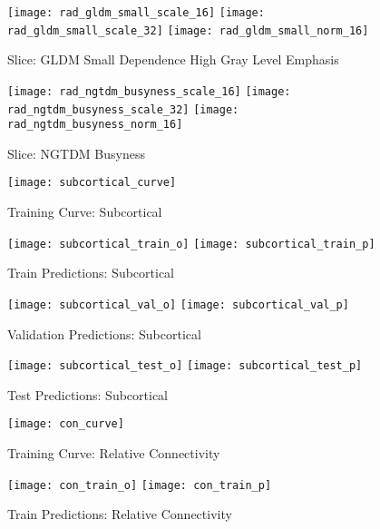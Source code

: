 
\begin{figure}[H]
\centering
\texttt{[image: rad\_gldm\_small\_scale\_16]}
\texttt{[image: rad\_gldm\_small\_scale\_32]}
\texttt{[image: rad\_gldm\_small\_norm\_16]}
\caption{Slice: GLDM Small Dependence High Gray Level Emphasis}
\label{fig:gls}
\end{figure}

\begin{figure}[H]
\centering
\texttt{[image: rad\_ngtdm\_busyness\_scale\_16]}
\texttt{[image: rad\_ngtdm\_busyness\_scale\_32]}
\texttt{[image: rad\_ngtdm\_busyness\_norm\_16]}
\caption{Slice: NGTDM Busyness}
\label{fig:ngb}
\end{figure}

\begin{figure}[H]
\centering
\texttt{[image: subcortical\_curve]}
\caption{Training Curve: Subcortical}
\label{fig:curve-sub}
\end{figure}

\begin{figure}[H]
\centering
\texttt{[image: subcortical\_train\_o]}
\texttt{[image: subcortical\_train\_p]}
\caption{Train Predictions: Subcortical}
\label{fig:pred-tra-sub}
\end{figure}

\begin{figure}[H]
\centering
\texttt{[image: subcortical\_val\_o]}
\texttt{[image: subcortical\_val\_p]}
\caption{Validation Predictions: Subcortical}
\label{fig:pred-val-sub}
\end{figure}

\begin{figure}[H]
\centering
\texttt{[image: subcortical\_test\_o]}
\texttt{[image: subcortical\_test\_p]}
\caption{Test Predictions: Subcortical}
\label{fig:pred-tes-sub}
\end{figure}

\begin{figure}[H]
\centering
\texttt{[image: con\_curve]}
\caption{Training Curve: Relative Connectivity}
\label{fig:curve-con}
\end{figure}

\begin{figure}[H]
\centering
\texttt{[image: con\_train\_o]}
\texttt{[image: con\_train\_p]}
\caption{Train Predictions: Relative Connectivity}
\label{fig:pred-tra-con}
\end{figure}

